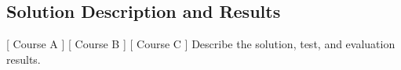 \subsection{Solution Description and Results}
[ Course A ] [ Course B ] [ Course C ] 
\newline
Describe the solution, test, and evaluation results.
